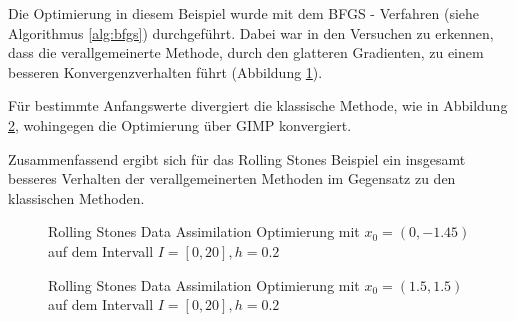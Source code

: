 Die Optimierung in diesem Beispiel wurde mit dem BFGS - Verfahren (siehe Algorithmus \ref{alg:bfgs}) durchgeführt. Dabei war in den Versuchen zu erkennen, dass die verallgemeinerte Methode, durch den glatteren Gradienten, zu einem besseren Konvergenzverhalten führt (Abbildung \ref{fig:rollingStonesOpt2}).

Für bestimmte Anfangswerte divergiert die klassische Methode, wie in Abbildung \ref{fig:rollingStonesOpt1}, wohingegen die Optimierung über GIMP konvergiert. 

Zusammenfassend ergibt sich für das Rolling Stones Beispiel ein insgesamt besseres Verhalten der verallgemeinerten Methoden im Gegensatz zu den klassischen Methoden.
\begin{figure}[H]
\footnotesize
\centering
\begin{minipage}[b]{0.49\linewidth}

\end{minipage}
\begin{minipage}[b]{0.49\linewidth}

\end{minipage}
\caption{Rolling Stones Data Assimilation Optimierung mit $x_0=(0,-1.45)$ auf dem Intervall $I = [0,20], h=0.2$}
\label{fig:rollingStonesOpt2}
\end{figure}

\begin{figure}[H]
\footnotesize 
\centering
\begin{minipage}[b]{0.49\linewidth}

\end{minipage}
\begin{minipage}[b]{0.49\linewidth}

\end{minipage}
\caption{Rolling Stones Data Assimilation Optimierung mit $x_0=(1.5,1.5)$ auf dem Intervall $I = [0,20], h=0.2$}
\label{fig:rollingStonesOpt1}
\end{figure}


